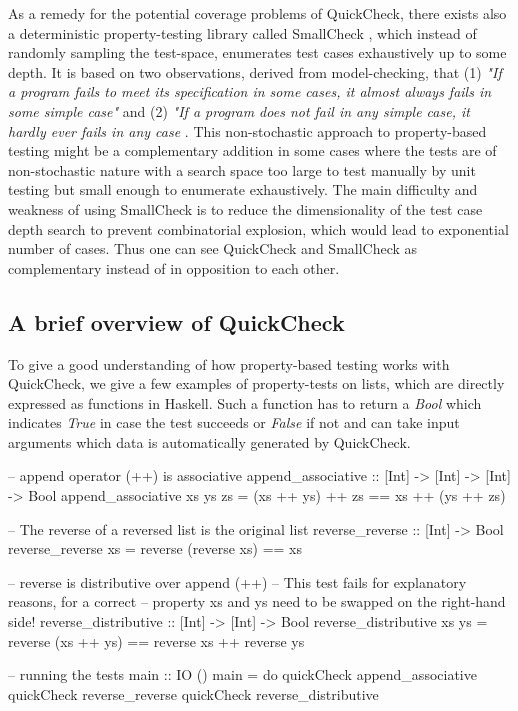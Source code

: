 \medskip

As a remedy for the potential coverage problems of QuickCheck, there exists also a deterministic property-testing library called SmallCheck \cite{runciman_smallcheck_2008}, which instead of randomly sampling the test-space, enumerates test cases exhaustively up to some depth. It is based on two observations, derived from model-checking, that (1) \textit{"If a program fails to meet its specification in some cases, it almost always fails in some simple case"} and (2) \textit{"If a program does not fail in any simple case, it hardly ever fails in any case} \cite{runciman_smallcheck_2008}. This non-stochastic approach to property-based testing might be a complementary addition in some cases where the tests are of non-stochastic nature with a search space too large to test manually by unit testing but small enough to enumerate exhaustively. The main difficulty and weakness of using SmallCheck is to reduce the dimensionality of the test case depth search to prevent combinatorial explosion, which would lead to exponential number of cases. Thus one can see QuickCheck and SmallCheck as complementary instead of in opposition to each other.

\subsection*{A brief overview of QuickCheck}
To give a good understanding of how property-based testing works with QuickCheck, we give a few examples of property-tests on lists, which are directly expressed as functions in Haskell. Such a function has to return a \textit{Bool} which indicates \textit{True} in case the test succeeds or \textit{False} if not and can take input arguments which data is automatically generated by QuickCheck.

\begin{HaskellCode}
-- append operator (++) is associative
append_associative :: [Int] -> [Int] -> [Int] -> Bool
append_associative xs ys zs = (xs ++ ys) ++ zs == xs ++ (ys ++ zs)

-- The reverse of a reversed list is the original list
reverse_reverse :: [Int] -> Bool
reverse_reverse xs = reverse (reverse xs) == xs

-- reverse is distributive over append (++)
-- This test fails for explanatory reasons, for a correct 
-- property xs and ys need to be swapped on the right-hand side!
reverse_distributive :: [Int] -> [Int] -> Bool
reverse_distributive xs ys = reverse (xs ++ ys) == reverse xs ++ reverse ys

-- running the tests
main :: IO ()
main = do
  quickCheck append_associative
  quickCheck reverse_reverse
  quickCheck reverse_distributive
\end{HaskellCode}

